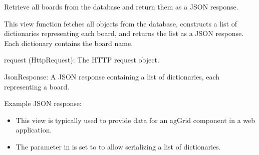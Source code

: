 \documentclass[letterpaper,10pt,english]{sphinxmanual}
\begin{document}

\begin{fulllineitems}
\label{\detokenize{app:app.views.get_boards}}
\pysigstartsignatures
{}
\pysigstopsignatures
\sphinxAtStartPar
Retrieve all boards from the database and return them as a JSON response.

\sphinxAtStartPar
This view function fetches all  objects from the database, constructs 
a list of dictionaries representing each board, and returns the list as a JSON response. 
Each dictionary contains the board name.
\begin{description}
\sphinxAtStartPar
request (HttpRequest): The HTTP request object.

\sphinxAtStartPar
JsonResponse: A JSON response containing a list of dictionaries, each representing a board.

\sphinxAtStartPar
Example JSON response:

\begin{sphinxVerbatim}[commandchars=\\\{\}]
\PYG{p}{[}
\PYG{p}{]}
\end{sphinxVerbatim}

\begin{itemize}
\item {} 
\sphinxAtStartPar
This view is typically used to provide data for an ag\sphinxhyphen{}Grid component in a web application.

\item {} 
\sphinxAtStartPar
The  parameter in  is set to  to allow serializing a list of dictionaries.

\end{itemize}

\end{description}

\end{fulllineitems}
\end{document}
